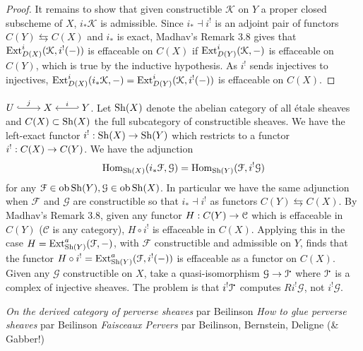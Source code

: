 \documentclass[deligne.tex]{subfiles}
\begin{document}
{\begin{proof}
It remains to show that given constructible $\mathcal K$ on $Y$ a proper 
closed subscheme of $X$, $i_*\mathcal K$ is admissible. Since
$i_*\dashv i^!$ is an adjoint pair of functors $C(Y)\leftrightarrows C(X)$
and $i_*$ is exact, Madhav's Remark 3.8 gives that
$\operatorname{Ext}^i_{D(X)}(\mathcal K,i^!(-))$ is effaceable on $C(X)$ if
$\operatorname{Ext}^i_{D(Y)}(\mathcal K,-)$ is effaceable on $C(Y)$,
which is true by the inductive hypothesis.
As $i^!$ sends injectives to injectives,
$\operatorname{Ext}^i_{D(X)}(i_*\mathcal K,-)=\operatorname{Ext}^i_{D(Y)}(\mathcal K,i^!(-))$ is 
effaceable on $C(X)$.
\end{proof}

\newpage
$\begin{tikzcd}[cramped] U\arrow[r,hook,"j"]&X&Y\arrow[l,"i"',hook']\end{tikzcd}$.
Let $\operatorname{Sh}(X)$ denote the abelian category of all étale sheaves and
$C(X)\subset\operatorname{Sh}(X)$ the full subcategory of constructible sheaves.
We have the left-exact functor $i^!:\operatorname{Sh}(X)\rightarrow\operatorname{Sh}(Y)$ which restricts to a
functor $i^!:C(X)\rightarrow C(Y)$. We have the adjunction
\begin{equation*}
	\operatorname{Hom}_{\operatorname{Sh}(X)}(i_*\mathcal F,\mathcal G)
	=\operatorname{Hom}_{\operatorname{Sh}(Y)}(\mathcal F,i^!\mathcal G)
\end{equation*}
for any $\mathcal F\in\operatorname{ob}\operatorname{Sh}(Y),\mathcal G\in\operatorname{ob}\operatorname{Sh}(X)$.
In particular we have the same adjunction when $\mathcal F$ and $\mathcal G$
are constructible so that $i_*\dashv i^!$ as functors
$C(Y)\leftrightarrows C(X)$.
By Madhav's Remark 3.8, given any functor $H:C(Y)\rightarrow\mathcal C$
which is effaceable in $C(Y)$ ($\mathcal C$ is any category),
$H\circ i^!$ is effaceable in $C(X)$. Applying this in the case
$H=\operatorname{Ext}^a_{\operatorname{Sh}(Y)}(\mathcal F,-)$, with $\mathcal F$ constructible and
admissible on $Y$, finds that the functor
$H\circ i^!=\operatorname{Ext}^a_{\operatorname{Sh}(Y)}(\mathcal F,i^!(-))$ is effaceable as a functor
on $C(X)$. Given any $\mathcal G$ constructible on $X$, take a
quasi-isomorphism $\mathcal G\ra\mathcal I^\dotp$ where $\mathcal I^\dotp$
is a complex of injective sheaves.
The problem is that $i^!\mathcal I^\dotp$ computes $Ri^!\mathcal G$, not
$i^!\mathcal G$.
}


\begin{thebibliography}{BBD}
	 \emph{On the derived category of perverse sheaves} par Beilinson
	 \emph{How to glue perverse sheaves} par Beilinson
	 \textit{Faisceaux Pervers}
	par Beilinson, Bernstein, Deligne (\& Gabber!)
\end{thebibliography}
\end{document}
